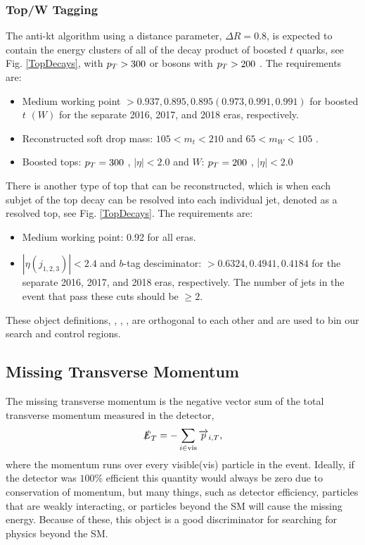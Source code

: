 \subsubsection{Top/W Tagging}\label{TopTagging}
The anti-kt algorithm using a distance parameter, $\Delta R=0.8$, is expected to contain the energy clusters of all of the decay product of boosted $t$ quarks, see Fig. \ref{TopDecays}, with $p_{T}>300$ \GeV{} or \W{} bosons with $p_{T}>200$ \GeV. The requirements are:
\begin{itemize}
	\item Medium working point $>0.937, 0.895, 0.895 (0.973, 0.991, 0.991)$ for boosted $t$ $(W)$ for the separate 2016, 2017, and 2018 eras, respectively.
	\item Reconstructed soft drop\cite{noauthor_soft_nodate} mass: $105<m_t<210$ \GeV{} and $65<m_W<105$ \GeV.
	\item Boosted tops: $p_{T}=300$ \GeV, $|\eta|<2.0$ and $W$: $p_{T}=200$ \GeV, $|\eta|<2.0$
\end{itemize}

There is another type of top that can be reconstructed, which is when each subjet of the top decay can be resolved into each individual jet, denoted as a resolved top, see Fig. \ref{TopDecays}. The requirements are:
\begin{itemize}
	\item Medium working point: 0.92 for all eras.
	\item $|\eta(j_{1,2,3})|<2.4$ and $b$-tag desciminator: $>0.6324, 0.4941, 0.4184$ for the separate 2016, 2017, and 2018 eras, respectively. The number of jets in the event that pass these cuts should be $\geq2$.
\end{itemize}
These object definitions, \nt, \nw, \nrt, are orthogonal to each other and are used to bin our search and control regions. 

\subsection{Missing Transverse Momentum}\label{MET}
The missing transverse momentum is the negative vector sum of the total transverse momentum measured in the detector,
\begin{equation}
\slashed{E}_{T}=-\sum_{i\in\text{vis}}\overrightarrow{p}_{i, T},
\end{equation}
where the momentum runs over every visible(vis) particle in the event. Ideally, if the detector was $100\%$ efficient this quantity would always be zero due to conservation of momentum, but many things, such as detector efficiency, particles that are weakly interacting, or particles beyond the SM will cause the missing energy. Because of these, this object is a good discriminator for searching for physics beyond the SM. 

